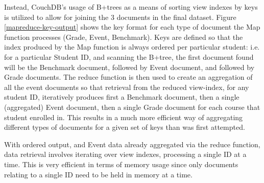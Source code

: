 Instead, CouchDB's usage of B+trees as a means of sorting view indexes by keys is utilized to allow for joining the 3 documents in the final dataset. Figure \ref{mapreduce-key-output} shows the key format for each type of document the Map function processes (Grade, Event, Benchmark). Keys are defined so that the index produced by the Map function is always ordered per particular student: i.e. for a particular Student ID, and scanning the B+tree, the first document found will be the Benchmark document, followed by Event document, and followed by Grade documents. The reduce function is then used to create an aggregation of all the event documents so that retrieval from the reduced view-index, for any student ID, iteratively produces first a Benchmark document, then a single (aggregated) Event document, then a single Grade document for each course that student enrolled in. This results in a much more efficient way of aggregating different types of documents for a given set of keys than was first attempted.

With ordered output, and Event data already aggregated via the reduce function, data retrieval involves iterating over view indexes, processing a single ID at a time. This is very efficient in terms of memory usage since only documents relating to a single ID need to be held in memory at a time.

